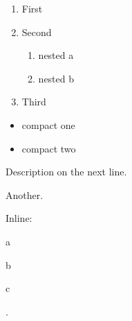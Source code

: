 \documentclass{article}
\begin{document}
\begin{enumerate}[label=(\roman*),leftmargin=*]
\item First \item Second \begin{enumerate}[label=\alph*.] \item nested a \item nested b\end{enumerate}
\item Third
\end{enumerate}
\begin{itemize}[noitemsep,label=$\triangleright$]
\item compact one \item compact two
\end{itemize}
\begin{description}[style=nextline]
\item[Term] Description on the next line.
\item[Longer term] Another.
\end{description}
Inline: \begin{enumerate*}[label=(\arabic*)]\item a \item b \item c\end{enumerate*}.
\end{document}
